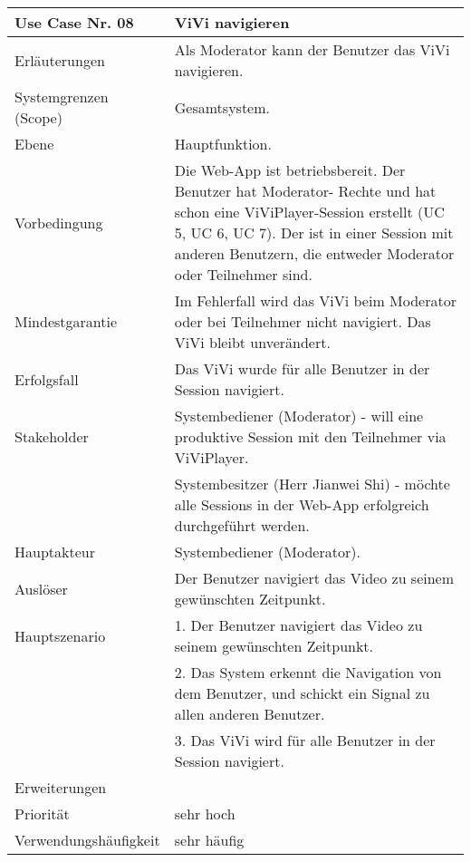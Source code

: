 \begin{tabularx}{\linewidth}{|l|X|}
	\hline
	Use Case Nr. 08			& \textbf{ViVi navigieren} \\ \hline
	Erläuterungen			& Als Moderator kann der Benutzer das ViVi navigieren. \\ \hline
	Systemgrenzen (Scope)	& Gesamtsystem. \\ \hline
	Ebene					& Hauptfunktion. \\ \hline
	Vorbedingung			& Die Web-App ist betriebsbereit. Der Benutzer hat Moderator-
							  Rechte und hat schon eine ViViPlayer-Session erstellt (UC 5, UC 6, UC 7). Der ist in einer Session mit anderen Benutzern, die entweder Moderator oder Teilnehmer sind. \\ \hline
	Mindestgarantie			& Im Fehlerfall wird das ViVi beim Moderator oder bei Teilnehmer 
							  nicht navigiert. Das ViVi bleibt unverändert. \\ \hline
	Erfolgsfall 			& Das ViVi wurde für alle Benutzer in der Session navigiert. 
							  \\ \hline
	Stakeholder				& Systembediener (Moderator) - will eine produktive Session mit den 
							  Teilnehmer via ViViPlayer. \\
							& Systembesitzer (Herr Jianwei Shi) - möchte alle Sessions in der 
							  Web-App erfolgreich durchgeführt werden. \\ \hline
	Hauptakteur				& Systembediener (Moderator). \\ \hline
	Auslöser				& Der Benutzer navigiert das Video zu seinem gewünschten 
							  Zeitpunkt. \\ \hline	
	Hauptszenario			& 1. Der Benutzer navigiert das Video zu seinem gewünschten 
							  Zeitpunkt. \\
							& 2. Das System erkennt die Navigation von dem Benutzer, und 
							  schickt ein Signal zu allen anderen Benutzer. \\ 
							& 3. Das ViVi wird für alle Benutzer in der Session navigiert. 
							  \\ \hline
	Erweiterungen			&  \\ \hline
	Priorität				& sehr hoch \\ \hline
	Verwendungshäufigkeit	& sehr häufig \\ \hline
\end{tabularx}